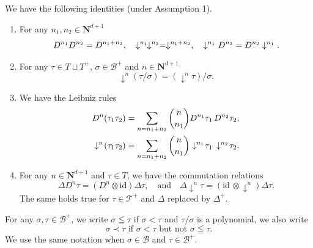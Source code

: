\documentclass[11pt]{preprint}
\def\id{\mathrm{id}}
\def\CT{\mathcal{T}}
\newcommand{\mcB}{\mathcal{B}}
\newcommand{\bfN}{\mathbf{N}}
\begin{document}
	\begin{lemma}\label{lem_DnSnpropenvrac}
		We have the following identities (under Assumption 1).
		\begin{enumerate}
			\item For any $n_1,n_2\in\bfN^{d+1}$
			\begin{equation}\label{eq_commutDnDownaroown}
			D^{n_1} D^{n_2} = D^{n_1+n_2},  \quad 
			\downarrow^{n_1}\hspace{-1pt} \downarrow^{n_2}\hspace{-0pt} = \downarrow^{n_1+n_2}, \quad 
			\downarrow^{n_1}D^{n_2} = D^{n_2}\downarrow^{n_1}.
		\end{equation}
			\item  For any $\tau\in T \sqcup T^+$,  $\sigma\in\mcB^+$ and $n\in\bfN^{d+1}$
			\begin{equation} \label{eq_commutSnDiv}
				\downarrow^n(\tau/\sigma) = (\downarrow^n\tau)/\sigma.
			\end{equation}
			\item  We have the Leibniz rules
			\begin{equation} \label{eq_leibnizSn}
			\begin{aligned}	D^n(\tau_1\tau_2) & = \sum_{n=n_1+n_2} \binom{n}{n_1}  D^{n_1}\tau_1 \, D^{n_2}\tau_2,
			\\
				\downarrow^n\hspace{-2pt}(\tau_1\tau_2) & = \sum_{n=n_1+n_2} \binom{n}{n_1} \downarrow^{n_1}\hspace{-2pt}\tau_1 \, \downarrow^{n_2}\hspace{-2pt}\tau_2.
				\end{aligned}
			\end{equation}
			\item For any $n\in\bfN^{d+1}$ and $\tau\in T$, we have the commutation relations
			\begin{equation*} \label{eq_commutDerivationDelta}
				\Delta D^n\tau = (D^n\otimes\id)\Delta \tau, \quad \text{and}\quad
				\Delta \downarrow^n\tau = (\id \, \otimes \downarrow^n)\Delta \tau.
			\end{equation*}
			The same holds true for $\tau \in \CT^+$ and $\Delta$ replaced by $ \Delta^{\!+} $.
		\end{enumerate}
	\end{lemma}
	For any $\sigma, \tau\in\mcB^{+}$, we write $\sigma\leqq\tau$ if $\sigma<\tau$ and $\tau/\sigma$ is a polynomial, we also write
	$$
	\sigma\prec \tau \textrm{ if } \sigma<\tau \textrm{ but not } \sigma\leqq\tau.
	$$ We use the same notation when $ \sigma \in \mcB $ and $\tau \in \mcB^+$.
\end{document}
